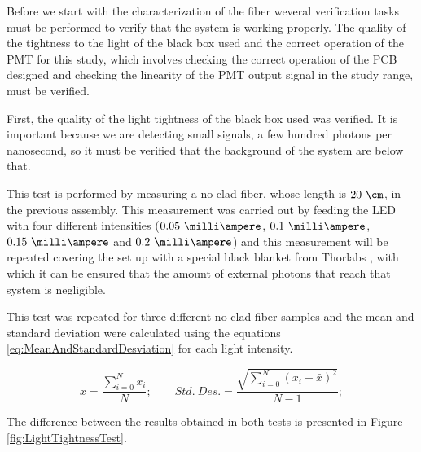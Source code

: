 Before we start with the characterization of the fiber weveral verification tasks must be performed to verify that the system is working properly. The quality of the tightness to the light of the black box used and the correct operation of the PMT for this study, which involves checking the correct operation of the PCB designed and checking the linearity of the PMT output signal in the study range, must be verified.

First, the quality of the light tightness of the black box used was verified. It is important because we are detecting small signals, a few hundred photons per nanosecond, so it must be verified that the background of the system are below that.

This test is performed by measuring a no-clad fiber, whose length is $20~\cm$, in the previous assembly. This measurement was carried out by feeding the LED with four different intensities ($0.05~\milli\ampere$, $0.1~\milli\ampere$, $0.15~\milli\ampere$ and $0.2~\milli\ampere$) and this measurement will be repeated covering the set up with a special black blanket from Thorlabs \cite{BlackBlancket}, with which it can be ensured that the amount of external photons that reach that system is negligible. 

This test was repeated for three different no clad fiber samples and the mean and standard deviation were calculated using the equations \ref{eq:MeanAndStandardDesviation} for each light intensity.

\begin{equation}
\bar{x}=\frac{\sum_{i=0}^{N}x_i}{N}; \qquad Std.~Des. = \frac{\sqrt{\sum_{i=0}^{N}(x_i-\bar{x})^2}}{N-1};
\label{eq:MeanAndStandardDesviation}
\end{equation}

The difference between the results obtained in both tests is presented in Figure \ref{fig:LightTightnessTest}.


